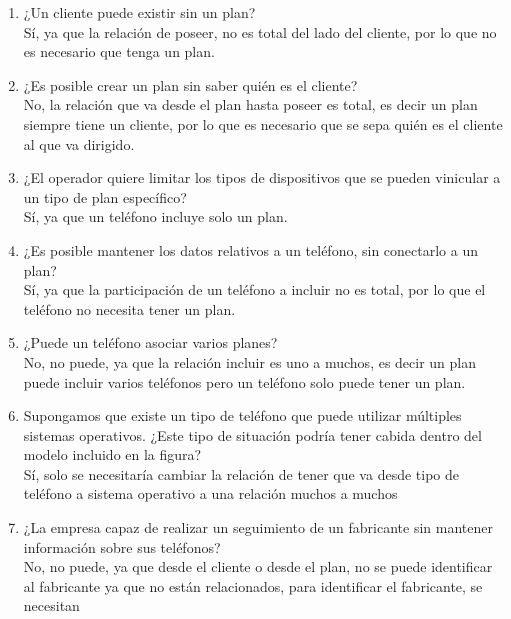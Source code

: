 \documentclass[a4paper, 12pt]{report}
\begin{document}
\begin{enumerate}
{\begin{enumerate}
{\begin{enumerate}
            Sí, ya que la relación de poseer es de muchos a muchos, por
            lo que un cliente puede tener más de un plan.
            \item ¿Un cliente puede existir sin un plan?\\
            Sí, ya que la relación de poseer, no es total del lado del
            cliente, por lo que no es necesario que tenga un plan.
            \item ¿Es posible crear un plan sin saber quién es el
            cliente?\\
            No, la relación que va desde el plan hasta poseer es total,
            es decir un plan siempre tiene un cliente, por lo que es
            necesario que se sepa quién es el cliente al que va
            dirigido.
            \item ¿El operador quiere limitar los tipos de dispositivos
            que se pueden vinicular a un tipo de plan específico?\\
            Sí, ya que un teléfono incluye solo un plan.
            \item ¿Es posible mantener los datos relativos a un
            teléfono, sin conectarlo a un plan?\\
            Sí, ya que la participación de un teléfono a incluir no es
            total, por lo que el teléfono no necesita tener un plan.
            \item ¿Puede un teléfono asociar varios planes?\\
            No, no puede, ya que la relación incluir es uno a muchos,
            es decir un plan puede incluir varios teléfonos pero un
            teléfono solo puede tener un plan.
            \item Supongamos que existe un tipo de teléfono que puede
            utilizar múltiples sistemas operativos. ¿Este tipo de
            situación podría tener cabida dentro del modelo incluido
            en la figura?\\
            Sí, solo se necesitaría cambiar la relación de tener que va
            desde tipo de teléfono a sistema operativo a una relación
            muchos a muchos
            \item ¿La empresa capaz de realizar un seguimiento de un
            fabricante sin mantener información sobre sus teléfonos?\\
            No, no puede, ya que desde el cliente o desde el plan,
            no se puede identificar al fabricante ya que no están
            relacionados, para identificar el fabricante, se necesitan

\end{enumerate}}
\end{enumerate}}
\end{enumerate}
\end{document}
